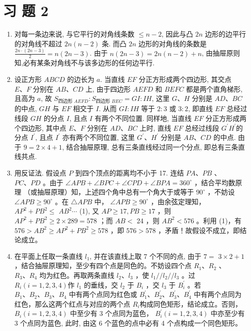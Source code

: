 \documentclass[10pt]{article}
\begin{document}
\section{习 题 2}
\begin{enumerate}
  \item 对每一条边来说, 与它平行的对角线条数 $\leqslant n-2$, 因此与凸 $2 n$ 边形的边平行的对角线不超过 $2 n(n-2)$ 条. 而凸 $2 n$ 边形的对角线的条数是 $\frac{2 n \cdot(2 n-3)}{2}=n(2 n-3)$. 由于 $n(2 n-3)=2 n(n-2)+n$, 由抽屉原则知,必有某条对角线不与该多边形的任何边平行.
  \item 设正方形 $A B C D$ 的边长为 $a$. 当直线 $E F$ 分正方形成两个四边形, 其交点 $E 、 F$ 分别在 $A B 、 C D$ 上, 由于四边形 $A E F D$ 和 $B E F C$ 都是两个直角梯形, 且高为 $a$, 故 $S_{\text {四边形 } A E F D}: S_{\text {四边形 } B E C}=G I: I H$, 这里 $G 、 H$ 分别是 $A D 、 B C$的中点, $G H$ 与 $E F$ 相交于 $I$. 从而 $G I: I H$ 等于 $2: 3$ 或 $3: 2$, 即直线 $E F$ 总经过线段 $G H$ 的分点 $I$, 且点 $I$ 有两个不同位置. 同样地, 当直线 $E F$ 分正方形成两个四边形, 其中点 $E 、 F$ 分别在 $A D 、 B C$ 上时, 直线 $E F$ 总经过线段 $G^{\prime} H^{\prime}$的分点 $I^{\prime}$, 且点 $I^{\prime}$ 亦有两个不同位置, 这里 $G^{\prime} 、 H^{\prime}$ 分别是 $A B 、 C D$ 的中点. 由于 $9=2 \times 4+1$, 结合抽屉原理, 总有三条直线经过同一个分点, 即总有三条直线共点.
  \item 用反证法. 假设点 $P$ 到四个顶点的距离均不小于 17. 连结 $P A 、 P B$ 、 $P C 、 P D$ 。由于 $\angle A P B+\angle B P C+\angle C P D+\angle B P A=360^{\circ}$ ，结合平均数原理 （或抽屉原理）知，上述四个角中总有一个角大于或等于 $90^{\circ}$ ，不妨设 $\angle A P B \geqslant 90^{\circ}$ 。在 $\triangle A P B$ 中， $\angle A P B \geqslant 90^{\circ}$ ，由余弦定理知， $A P^{2}+P B^{2} \leqslant$ $A B^{2} \cdots$ (1), 又 $A P \geqslant 17, P B \geqslant 17$ ，则 $A P^{2}+P B^{2} \geqslant 2 \times 289=578$ ；而 $A B<$ 24 ，则 $A B^{2}<576$ 。利用 (1)，有 $576>A B^{2} \geqslant A P^{2}+P B^{2} \geqslant 578$ ，即 $576>578$ ，矛盾！故假设不成立，即结论成立。
  \item 在平面上任取一条直线 $l_{1}$, 并在该直线上取 7 个不同的点, 由于 $7=$ $3 \times 2+1$ ，结合抽屉原理知，至少有四个点是同色的。不妨设四个点 $R_{1} 、 R_{2}$ 、 $R_{3} 、 R_{4}$ 均为红色。再取两条直线 $l_{2} 、 l_{3}$ ，使 $l_{1} / / l_{2} / / l_{3}$ 。过 $R_{i}(i=1,2,3,4)$作 $l_{1}$ 的垂线，交 $l_{2}$ 于 $B_{i}$ ，交 $l_{3}$ 于 $B_{i}^{\prime}$ 。若 $B_{1} 、 B_{2} 、 B_{3} 、 B_{4}$ 中有两个点同为红色或 $B_{1}^{\prime} 、 B_{2}^{\prime} 、 B_{3}^{\prime} 、 B_{4}^{\prime}$ 中有两个点同为红色，那么这两个红点与对应的两个点 $R_{i}$构成同色矩形，结论成立。否则， $B_{i}(i=1,2,3,4)$ 中至少有 3 个点同为蓝色， $B_{i}^{\prime}(i=1,2,3,4)$ 中亦至少有 3 个点同为蓝色, 此时, 由这 6 个蓝色的点中必有 4 个点构成一个同色矩形。

\end{enumerate}
\end{document}
